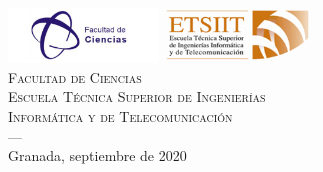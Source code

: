 \begin{titlepage}
\begin{minipage}{\textwidth}
	\includegraphics[width=0.3\textwidth]{images/logo_ciencias.png}
	\hspace{1.5cm}
	\includegraphics[width=0.3\textwidth]{images/logo_etsiit.png}\\[0.1cm]
	\textsc{Facultad de Ciencias\\Escuela Técnica Superior de Ingenierías\\Informática y de Telecomunicación}\\
	\textsc{---}\\
	Granada, septiembre de 2020
\end{minipage}
\newpage
\end{titlepage}


